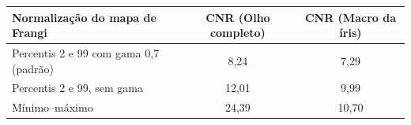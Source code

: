 \begin{tabular}{lcc}
\toprule
Normalização do mapa de Frangi & CNR (Olho completo) & CNR (Macro da íris) \\
\midrule
Percentis 2 e 99 com gama 0,7 (padrão) & 8,24 & 7,29 \\
Percentis 2 e 99, sem gama & 12,01 & 9,99 \\
Mínimo--máximo & 24,39 & 10,70 \\
\bottomrule
\end{tabular}
